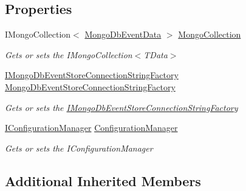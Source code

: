 \subsection*{Properties}
\begin{DoxyCompactItemize}
\item 
I\+Mongo\+Collection$<$ \hyperlink{classCqrs_1_1MongoDB_1_1Events_1_1MongoDbEventData}{Mongo\+Db\+Event\+Data} $>$ \hyperlink{classCqrs_1_1MongoDB_1_1Events_1_1MongoDbEventStore_af2dfb3af9b76e8b1cab0f7dc68cdc377_af2dfb3af9b76e8b1cab0f7dc68cdc377}{Mongo\+Collection}
\begin{DoxyCompactList}\small\item\em Gets or sets the I\+Mongo\+Collection$<$\+T\+Data$>$ \end{DoxyCompactList}\item 
\hyperlink{interfaceCqrs_1_1MongoDB_1_1Events_1_1IMongoDbEventStoreConnectionStringFactory}{I\+Mongo\+Db\+Event\+Store\+Connection\+String\+Factory} \hyperlink{classCqrs_1_1MongoDB_1_1Events_1_1MongoDbEventStore_aa008df8aa5d4e63a2123735acb7cd775_aa008df8aa5d4e63a2123735acb7cd775}{Mongo\+Db\+Event\+Store\+Connection\+String\+Factory}
\begin{DoxyCompactList}\small\item\em Gets or sets the \hyperlink{interfaceCqrs_1_1MongoDB_1_1Events_1_1IMongoDbEventStoreConnectionStringFactory}{I\+Mongo\+Db\+Event\+Store\+Connection\+String\+Factory} \end{DoxyCompactList}\item 
\hyperlink{interfaceCqrs_1_1Configuration_1_1IConfigurationManager}{I\+Configuration\+Manager} \hyperlink{classCqrs_1_1MongoDB_1_1Events_1_1MongoDbEventStore_a2944d6e589401531ba4283b984140c0e_a2944d6e589401531ba4283b984140c0e}{Configuration\+Manager}
\begin{DoxyCompactList}\small\item\em Gets or sets the I\+Configuration\+Manager \end{DoxyCompactList}\end{DoxyCompactItemize}
\subsection*{Additional Inherited Members}


